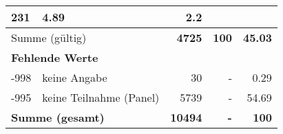 \begin{longtable}{lXrrr}
       \num{231} &
       \num[round-mode=places,round-precision=2]{4,89} &
         \num[round-mode=places,round-precision=2]{2,2} \\
     \midrule
     \multicolumn{2}{l}{Summe (gültig)} &
       \textbf{\num{4725}} &
     \textbf{100} &
       \textbf{\num[round-mode=places,round-precision=2]{45,03}} \\
     \multicolumn{5}{l}{\textbf{Fehlende Werte}}\\
       -998 &
       keine Angabe &
         \num{30} &
        - &
         \num[round-mode=places,round-precision=2]{0,29} \\
       -995 &
       keine Teilnahme (Panel) &
         \num{5739} &
        - &
         \num[round-mode=places,round-precision=2]{54,69} \\
     \midrule
     \multicolumn{2}{l}{\textbf{Summe (gesamt)}} &
          \textbf{\num{10494}} &
        \textbf{-} &
        \textbf{100} \\
     \bottomrule
     \end{longtable}
     

